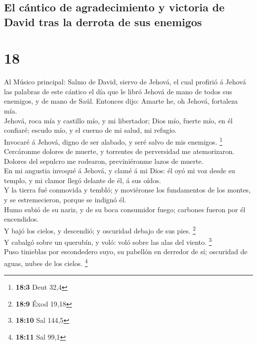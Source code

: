 \hypertarget{el-cuxe1ntico-de-agradecimiento-y-victoria-de-david-tras-la-derrota-de-sus-enemigos}{%
\subsection{El cántico de agradecimiento y victoria de David tras la
derrota de sus
enemigos}\label{el-cuxe1ntico-de-agradecimiento-y-victoria-de-david-tras-la-derrota-de-sus-enemigos}}

\hypertarget{section-17}{%
\section{18}\label{section-17}}

 Al Músico principal: Salmo de David, siervo de Jehová, el
cual profirió á Jehová las palabras de este cántico el día que le libró
Jehová de mano de todos sus enemigos, y de mano de Saúl. Entonces dijo:
Amarte he, oh Jehová, fortaleza mía.\\
 Jehová, roca mía y castillo mío, y mi libertador; Dios
mío, fuerte mío, en él confiaré; escudo mío, y el cuerno de mi salud, mi
refugio.\\
 Invocaré á Jehová, digno de ser alabado, y seré salvo de
mis enemigos. \footnote{\textbf{18:3} Deut 32,4}\\
 Cercáronme dolores de muerte, y torrentes de perversidad
me atemorizaron.\\
 Dolores del sepulcro me rodearon, previniéronme lazos de
muerte.\\
 En mi angustia invoqué á Jehová, y clamé á mi Dios: él
oyó mi voz desde su templo, y mi clamor llegó delante de él, á sus
oídos.\\
 Y la tierra fué conmovida y tembló; y moviéronse los
fundamentos de los montes, y se estremecieron, porque se indignó él.\\
 Humo subió de su nariz, y de su boca consumidor fuego;
carbones fueron por él encendidos.\\
 Y bajó los cielos, y descendió; y oscuridad debajo de sus
pies. \footnote{\textbf{18:9} Éxod 19,18}\\
 Y cabalgó sobre un querubín, y voló: voló sobre las alas
del viento. \footnote{\textbf{18:10} Sal 144,5}\\
 Puso tinieblas por escondedero suyo, su pabellón en
derredor de sí; oscuridad de aguas, nubes de los cielos. \footnote{\textbf{18:11}
  Sal 99,1}\\

